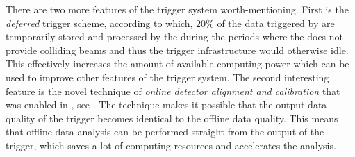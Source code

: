 There are two more features of the \lhcb trigger system worth-mentioning. First is the {\it deferred}
trigger scheme, according to which, $20\%$ of the data triggered by \lzero are temporarily stored and processed by the \hlt
during the periods where the \lhc does not provide colliding beams and thus the \lhcb trigger infrastructure
would otherwise idle. This effectively increases the amount of available computing power which can be used
to improve other features of the trigger system. The second interesting feature is the novel technique of
{\it online detector alignment and calibration} that was enabled in \runtwo, see \cite{Aaij:2016rxn}.
The technique makes it possible that the output data quality of the trigger becomes identical to the offline data quality.
This means that offline data analysis can be performed straight from the output of the trigger, which saves
a lot of computing resources and accelerates the analysis.
